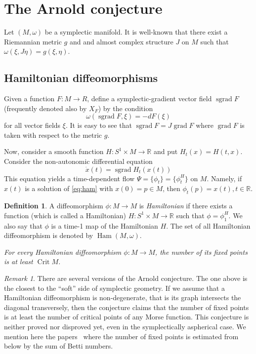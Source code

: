 \documentclass[12pt]{amsart}
\newcommand{\B}[1]{{\mathbb #1}}
\newcommand\R{\B R}
\numberwithin{equation}{section}
\theoremstyle{definition}
\newtheorem{definition}[subsection]{Definition}
\theoremstyle{remark}
\newtheorem{remark}[subsection]{Remark}
\numberwithin{figure}{section}
\numberwithin{table}{section}
\newcommand{\om}{{\omega}}
\newcommand{\Mo}{(M,\omega )}
\newcommand\Ham{\operatorname{Ham}}
\newcommand\grad{\operatorname{grad}}
\newcommand\sgrad{\operatorname{sgrad}}
\newcommand\Crit{\operatorname{Crit}}
\begin{document}
\section{The Arnold conjecture}\label{S:arnold} 
 
Let $(M, \omega)$ be a symplectic manifold. It is well-known that there exist a  
Riemannian metric $g$ and and almost complex structure $J$ on $M$ such that  
$\om (\xi, J\eta)=g(\xi, \eta)$.  
 
\subsection{Hamiltonian diffeomorphisms}  
Given a function $F: M \to R$, define a symplectic-gradient vector field  
$\sgrad F$ (frequently denoted also by $X_F$) by the condition 
% 
\begin{equation} 
\omega(\sgrad F, \xi)=-dF(\xi) 
\end{equation} 
% 
for all vector fields $\xi$. It is easy to see that $\sgrad F=J\grad F$ where  
$\grad F$ is  
taken with respect to the metric $g$. 
 
Now, consider a smooth function $H: S^1\times M \to \R$ and put  
$H_t(x)=H(t,x)$.  
Consider the non-autonomic differential equation 
% 
\begin{equation}\label{eq:ham} 
\dot x(t)=\sgrad H_t(x(t))  
\end{equation} 
% 
This equation yields a time-dependent flow $\Psi=\{\phi_t\}=\{\phi_t^H\}$ on  
$M$. Namely, if $x(t)$ is a solution of \eqref{eq:ham} with $x(0)=p\in M$, then  
$\phi_t(p)=x(t), t\in \R$.  
 
\begin{definition} 
A diffeomorphism $\phi: M \to M$ is {\it Hamiltonian} if there exists a  
function (which is called a Hamiltonian) 
$H:S^1\times M \to \R$  such that  
$\phi=\phi_1^H$. We also say that $\phi$ is a time-1 map of the Hamiltonian $H$. 
The set of all Hamiltonian diffeomorphism is denoted by $\Ham\Mo$. 
\end{definition} 
 
  {\it For every Hamiltonian 
diffeomorphism  
$\phi: M\to M$, the number of its fixed points is at least $\Crit M$.} 
 
\begin{remark} 
There are several versions of the Arnold conjecture. The one above 
is the closest to the ``soft'' side of  symplectic geometry. 
If we assume that a Hamiltonian diffeomorphism is non-degenerate, 
that is its graph intersects the diagonal transversely,  
then the conjecture claims that 
the number of fixed points is at least the number of critical 
points of any Morse function. This conjecture is neither proved nor disproved 
yet, even in the symplectically aspherical case. We mention here the 
papers~\cite{FO,LT} where the number of fixed points is estimated from below by 
the sum of Betti numbers.
\end{remark} 
 
\end{document}
